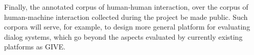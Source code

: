 
Finally, the annotated corpus of human-human interaction, over the corpus of
human-machine interaction collected during the project be made public. Such
corpora will serve, for example, to design more general platform for evaluating
dialog systems, which go beyond the aspects evaluated by currently existing
platforms as GIVE.


